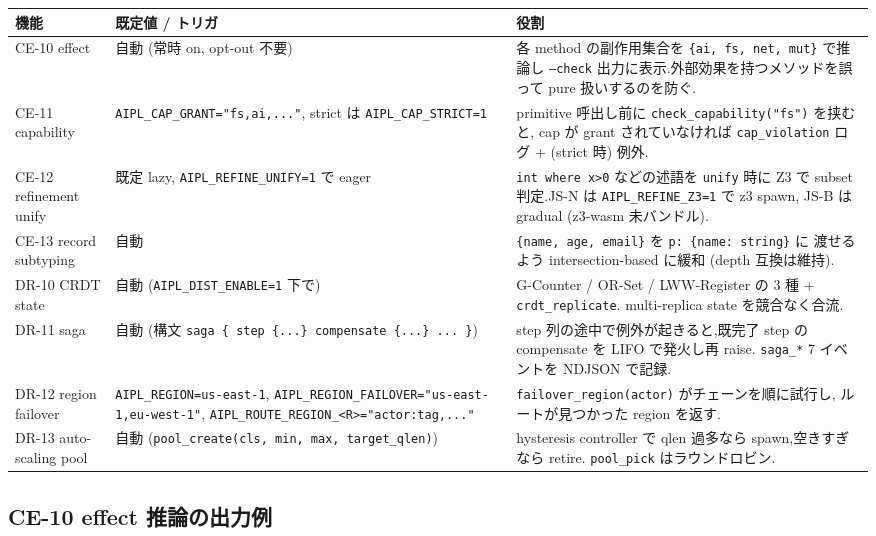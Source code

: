 \documentclass[11pt,a4paper]{article}
\begin{document}
\begin{center}
\begin{tabular}{p{2cm}p{4.5cm}p{7cm}}
\toprule
機能 & 既定値 / トリガ & 役割 \\
\midrule
CE-10 effect & 自動 (常時 on, opt-out 不要) &
  各 method の副作用集合を \texttt{\{ai, fs, net, mut\}} で推論し
  \texttt{--check} 出力に表示.外部効果を持つメソッドを誤って pure
  扱いするのを防ぐ. \\
CE-11 capability & \texttt{AIPL\_CAP\_GRANT="fs,ai,..."}, strict は \texttt{AIPL\_CAP\_STRICT=1} &
  primitive 呼出し前に \texttt{check\_capability("fs")} を挟むと,
  cap が grant されていなければ \texttt{cap\_violation} ログ +
  (strict 時) 例外. \\
CE-12 refinement unify & 既定 lazy, \texttt{AIPL\_REFINE\_UNIFY=1} で eager &
  \texttt{int where x>0} などの述語を \texttt{unify} 時に Z3 で
  subset 判定.JS-N は \texttt{AIPL\_REFINE\_Z3=1} で z3 spawn,
  JS-B は gradual (z3-wasm 未バンドル). \\
CE-13 record subtyping & 自動 &
  \texttt{\{name, age, email\}} を \texttt{p: \{name: string\}} に
  渡せるよう intersection-based に緩和 (depth 互換は維持). \\
DR-10 CRDT state & 自動 (\texttt{AIPL\_DIST\_ENABLE=1} 下で) &
  G-Counter / OR-Set / LWW-Register の 3 種 + \texttt{crdt\_replicate}.
  multi-replica state を競合なく合流. \\
DR-11 saga & 自動 (構文 \texttt{saga \{ step \{...\} compensate \{...\} ... \}}) &
  step 列の途中で例外が起きると,既完了 step の compensate を
  LIFO で発火し再 raise. \texttt{saga\_*} 7 イベントを NDJSON で記録. \\
DR-12 region failover & \texttt{AIPL\_REGION=us-east-1}, \texttt{AIPL\_REGION\_FAILOVER="us-east-1,eu-west-1"}, \texttt{AIPL\_ROUTE\_REGION\_<R>="actor:tag,..."} &
  \texttt{failover\_region(actor)} がチェーンを順に試行し,
  ルートが見つかった region を返す. \\
DR-13 auto-scaling pool & 自動 (\texttt{pool\_create(cls, min, max, target\_qlen)}) &
  hysteresis controller で qlen 過多なら spawn,空きすぎなら retire.
  \texttt{pool\_pick} はラウンドロビン. \\
\bottomrule
\end{tabular}
\end{center}

\subsection{CE-10 effect 推論の出力例}
\end{document}
